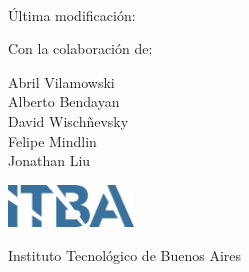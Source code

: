 
\begin{titlepage}
\thispagestyle{empty}

\begin{center}
    \vspace*{1cm}
    
    \Huge
    \textbf{\thetitle}
    
    \vspace{0.25cm}
    \large
    \codigomateria \\
    \vspace{0.25cm}
    \Large
    \cuatrimestre

    \vspace{0.25cm}
    \tiny
    Última modificación: \thedate

    
    \vspace{1.5cm}
    
    \normalsize
    \textbf{\theauthor}

    \medskip

    Con la colaboración de:

    Abril Vilamowski%
    \\%
    Alberto Bendayan%
    \\%
    David Wischñevsky%
    \\%
    Felipe Mindlin%
    \\%
    Jonathan Liu%
    
    \vfill
    
    \vspace{0.8cm}
    \includegraphics[width=0.25\textwidth]{itba_logo.png}
    
    \vspace{0.8cm}
    
    Instituto Tecnológico de Buenos Aires\\
    
    
\end{center}

\end{titlepage}

\restoregeometry %
